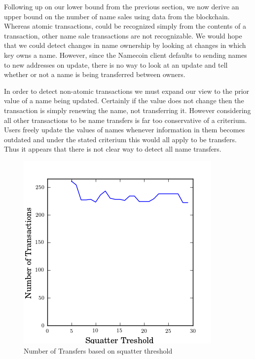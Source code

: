 Following up on our lower bound from the previous section, we now derive an upper bound on the number of name sales using data from the blockchain. Whereas atomic transactions, could be recognized simply from the contents of a transaction, other name sale transactions are not recognizable. We would hope that we could detect changes in name ownership by looking at changes in which key owns a name. However, since the Namecoin client defaults to sending names to new addresses on update, there is no way to look at an update and tell whether or not a name is being transferred between owners.

In order to detect non-atomic transactions we must expand our view to the prior value of a name being updated. Certainly if the value does not change then the transaction is simply renewing the name, not transferring it. However considering all other transactions to be name transfers is far too conservative of a criterium. Users freely update the values of names whenever information in them becomes outdated and under the stated criterium this would all apply to be transfers. Thus it appears that there is not clear way to detect all name transfers.

\begin{figure}
  \centering
  \includegraphics[width=0.9\columnwidth]{figures/transfers}
  \caption{Number of Transfers based on squatter threshold}
  \label{fig:percentSquatter}
\end{figure}


